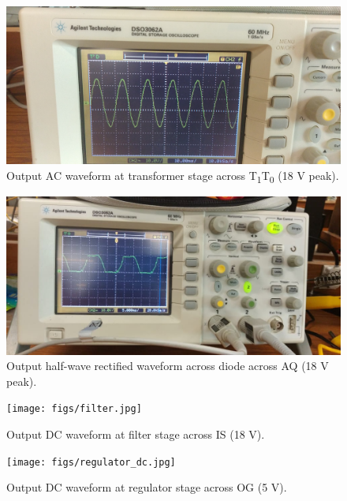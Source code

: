\documentclass[journal,12pt,twocolumn]{IEEEtran}
\begin{document}
\begin{figure}[!ht]
    \includegraphics[width=\columnwidth]{figs/transformer.jpg}
    \caption{Output AC waveform at transformer stage across T\textsubscript{1}T\textsubscript{0} (18 V peak).}
    \label{fig:transformer}
\end{figure}

\begin{figure}[!ht]
    \includegraphics[width=\columnwidth]{figs/rectifier.jpg}
    \caption{Output half-wave rectified waveform across diode across AQ (18 V peak).}
    \label{fig:rectifier}
\end{figure}

\begin{figure}[!ht]
    \texttt{[image: figs/filter.jpg]}
    \caption{Output DC waveform at filter stage across IS (18 V).}
    \label{fig:filter}
\end{figure}

\begin{figure}[!ht]
    \texttt{[image: figs/regulator\_dc.jpg]}
    \caption{Output DC waveform at regulator stage across OG (5 V).}
    \label{fig:regulator_dc}
\end{figure}
\end{document}
